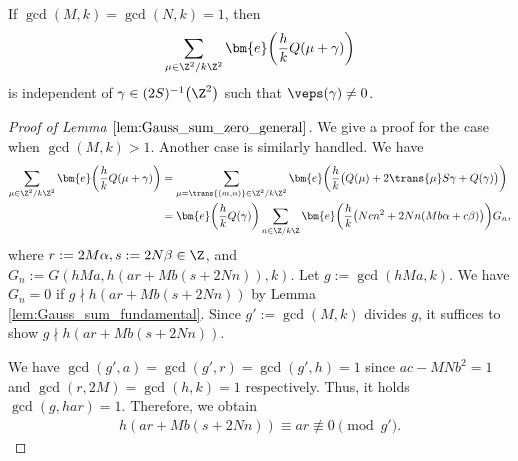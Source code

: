 \begin{lem} \label{lem:Gauss_sum_indep_general}
	If $ \gcd(M, k) = \gcd(N, k) = 1 $, then
	\begin{gather*}
	\sum_{\mu \in \Z^2/k\Z^2} \bm{e}\bigg( \frac{h}{k} Q(\mu + \gamma) \bigg)
	\end{gather*}
	is independent of $ \gamma \in (2S)^{-1}\big(\Z^2\big) $ such that $ \veps(\gamma) \neq 0 $.
\end{lem}

\begin{proof}[Proof of Lemma $ \ref{lem:Gauss_sum_zero_general} $]
	We give a proof for the case when $ \gcd(M, k) > 1 $.
	Another case is similarly handled.
	We have
	\begin{align*}
		\sum_{\mu \in \Z^2/k\Z^2} \bm{e}\bigg( \frac{h}{k} Q(\mu + \gamma) \bigg)
		&= \sum_{\mu = \trans{(m, n)} \in \Z^2/k\Z^2} \bm{e}\bigg( \frac{h}{k} \big( Q(\mu) + 2\trans{\mu} S \gamma + Q(\gamma) \big) \bigg) \\
		&= \bm{e}\bigg(\frac{h}{k} Q(\gamma)\bigg)
		\sum_{n \in \Z/k\Z} \bm{e}\bigg( \frac{h}{k} \big( N c n^2 + 2Nn(Mb \alpha + c \beta) \big) \bigg) G_n,
	\end{align*}
	where $ r := 2M \alpha, s := 2N \beta \in \Z $, and $ G_n := G(hMa, h(ar + Mb(s + 2Nn)), k) $.
	Let $ g := \gcd(hMa, k) $.
	We have $ G_n = 0 $ if $ g \nmid h(ar + Mb(s + 2Nn)) $ by Lemma \ref{lem:Gauss_sum_fundamental}.
	Since $ g' := \gcd(M, k) $ divides $ g $, it suffices to show $ g \nmid h(ar + Mb(s + 2Nn)) $.
	
	We have $ \gcd(g', a) = \gcd(g', r) = \gcd(g', h) = 1 $ since $ ac - MN b^2 = 1 $ and $ \gcd(r, 2M) = \gcd(h, k) = 1 $ respectively.
	Thus, it holds $ \gcd(g, har) = 1 $.
	Therefore, we obtain
	\begin{gather*}
	h(ar + Mb(s + 2Nn)) \equiv ar \not\equiv 0 \pmod{g'}.\tag*{\qed}
\end{gather*}
\renewcommand{\qed}{}
\end{proof}


